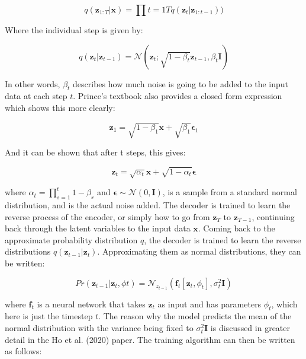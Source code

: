 \documentclass[12pt]{report} %
\begin{document}
\begin{equation}
q(\mathbf{z}_{1:T}|\mathbf{x}) = \prod{t=1}{T}q(\mathbf{z}_{t}|\mathbf{z}_{1:t-1}))
\end{equation}

Where the individual step is given by:

\begin{equation}
  q(\mathbf{z}_{t}|\mathbf{z}_{t-1}) = \mathcal{N}(\mathbf{z}_{t}; \sqrt{1 - \beta_{t}}\mathbf{z}_{t-1}, \beta_{t}\mathbf{I})
\end{equation}

In other words, $\beta_{t}$ describes how much noise is going to be added to the input data at each step $t$. Prince's textbook also provides a closed form expression which shows this more clearly\cite{prince2023understanding}:

\begin{equation}
  \mathbf{z}_{1} = \sqrt{1 - \beta_{1}}\mathbf{x} + \sqrt{\beta_{1}}\mathbf{\epsilon}_{1}
\end{equation}

And it can be shown that after t steps, this gives:

\begin{equation}
  \mathbf{z}_{t} = \sqrt{\alpha_{t}}\mathbf{x} + \sqrt{1 - \alpha_{t}}\mathbf{\epsilon}
\end{equation}

where $\alpha_{t} = \prod_{s=1}^{t} 1 - \beta_{s}$ and $\mathbf{\epsilon} \sim \mathcal{N}(0, \mathbf{I})$, is a sample from a standard normal distribution, and is the actual noise added. The decoder is trained to learn the reverse process of the encoder, or simply how to go from $\mathbf{z}_{T}$ to $\mathbf{z}_{T-1}$, continuing back through the latent variables to the input data $\mathbf{x}$. Coming back to the approximate probability distribution $q$, the decoder is trained to learn the reverse distributions $q(\mathbf{z}_{t-1}|\mathbf{z}_{t})$. Approximating them as normal distributions, they can be written:

\begin{equation}
  Pr(\mathbf{z}_{t-1}|\mathbf{z}_{t}, \phi{t}) = \mathcal{N}_{z_{t-1}}(\mathbf{f}_{t}[\mathbf{z}_{t}, \phi_{t}], \sigma_{t}^{2}\mathbf{I})
\end{equation}

where $\mathbf{f}_{t}$ is a neural network that takes $\mathbf{z}_{t}$ as input and has parameters $\phi_{t}$, which here is just the timestep $t$. The reason why the model predicts the mean of the normal distribution with the variance being fixed to $\sigma_{t}^{2}\mathbf{I}$ is discussed in greater detail in the Ho et al. (2020) paper\cite{ho2020denoising}. The training algorithm can then be written as follows:
\end{document}
